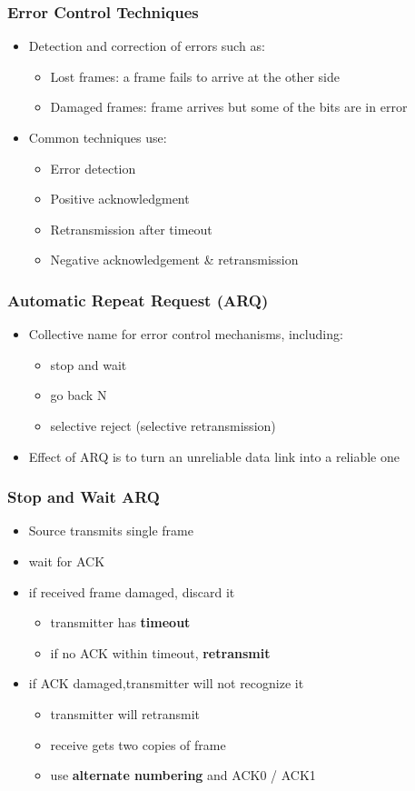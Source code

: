 \documentclass[pdflatex,compress]{beamer}
\begin{document}
\begin{frame}
	\frametitle{Error Control Techniques}
	\begin{itemize}
		\item Detection and correction of errors such as:
		\begin{itemize}
			\item Lost frames: a frame fails to arrive at the other side
			\item Damaged frames: frame arrives but some of the bits are in error
		\end{itemize}
		\item Common techniques use:
		\begin{itemize}
			\item Error detection
			\item Positive acknowledgment
			\item Retransmission after timeout
			\item Negative acknowledgement \& retransmission
		\end{itemize}
	\end{itemize}	
\end{frame}

\begin{frame}
	\frametitle{Automatic Repeat Request (ARQ)}
	\begin{itemize}
		\item Collective name for error control mechanisms, including:
		\begin{itemize}
			\item stop and wait
			\item go back N
			\item selective reject (selective retransmission)
		\end{itemize}
		\item Effect of ARQ is to turn an unreliable data link into a reliable one
	\end{itemize}
\end{frame}

\begin{frame}
	\frametitle{Stop and Wait ARQ}
	\begin{itemize}
		\item Source transmits single frame
		\item wait for ACK
		\item if received frame damaged, discard it
		\begin{itemize}
			\item transmitter has \textbf{timeout}
			\item if no ACK within timeout, \textbf{retransmit}
		\end{itemize}
		\item if ACK damaged,transmitter will not recognize it
		\begin{itemize}
			\item transmitter will retransmit
			\item receive gets two copies of frame
			\item use \textbf{alternate numbering} and ACK0 / ACK1
		\end{itemize}
	\end{itemize}
\end{frame}
\end{document}
